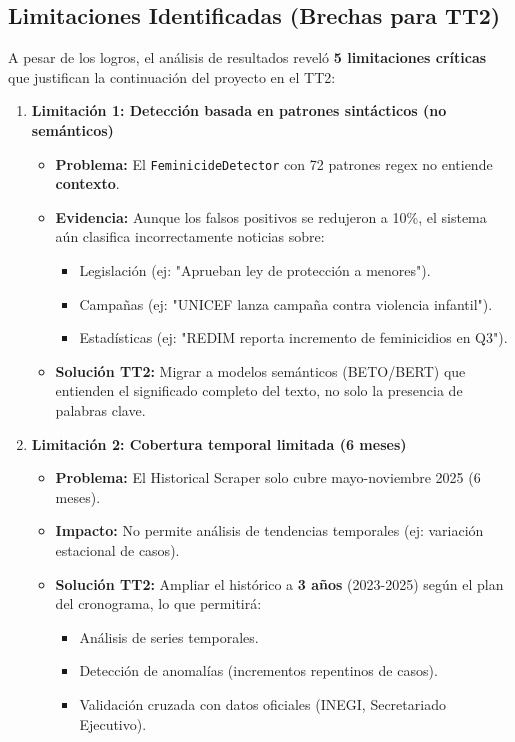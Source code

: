 \subsection{Limitaciones Identificadas (Brechas para TT2)}
\label{subsec:limitaciones_tt2}

A pesar de los logros, el análisis de resultados reveló \textbf{5 limitaciones críticas} que justifican la continuación del proyecto en el TT2:

\begin{enumerate}
    \item \textbf{Limitación 1: Detección basada en patrones sintácticos (no semánticos)}
    \begin{itemize}
        \item \textbf{Problema:} El \texttt{FeminicideDetector} con 72 patrones regex no entiende \textbf{contexto}.
        \item \textbf{Evidencia:} Aunque los falsos positivos se redujeron a 10\%, el sistema aún clasifica incorrectamente noticias sobre:
        \begin{itemize}
            \item Legislación (ej: "Aprueban ley de protección a menores").
            \item Campañas (ej: "UNICEF lanza campaña contra violencia infantil").
            \item Estadísticas (ej: "REDIM reporta incremento de feminicidios en Q3").
        \end{itemize}
        \item \textbf{Solución TT2:} Migrar a modelos semánticos (BETO/BERT) que entienden el significado completo del texto, no solo la presencia de palabras clave.
    \end{itemize}
    
    \item \textbf{Limitación 2: Cobertura temporal limitada (6 meses)}
    \begin{itemize}
        \item \textbf{Problema:} El Historical Scraper solo cubre mayo-noviembre 2025 (6 meses).
        \item \textbf{Impacto:} No permite análisis de tendencias temporales (ej: variación estacional de casos).
        \item \textbf{Solución TT2:} Ampliar el histórico a \textbf{3 años} (2023-2025) según el plan del cronograma, lo que permitirá:
        \begin{itemize}
            \item Análisis de series temporales.
            \item Detección de anomalías (incrementos repentinos de casos).
            \item Validación cruzada con datos oficiales (INEGI, Secretariado Ejecutivo).
        \end{itemize}
    \end{itemize}
    

\end{enumerate}
